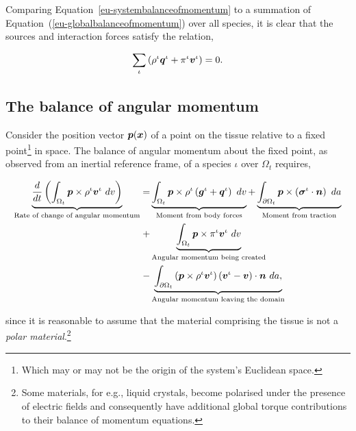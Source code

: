 \noindent Comparing Equation~\ref{eu-systembalanceofmomentum} to a
summation of Equation~(\ref{eu-globalbalanceofmomentum}) over all
species, it is clear that the sources and interaction forces satisfy
the relation,

\begin{equation}
\sum\limits_{\iota}\left( \rho^{\iota}\mbox{\boldmath$ q$}^{\iota} + \pi^{\iota}
\mbox{\boldmath$ v$}^{\iota} \right) = 0.
\label{eu-summationrelationmomentum}
\end{equation}

\subsection{The balance of angular momentum}
\label{eu-balance-of-angular-momentum}

Consider the position vector $\mbox{\boldmath$ p$}(\mbox{\boldmath$ x$})$ of a point on the tissue
relative to a fixed point\footnote{Which may or may not be
  the origin of the system's Euclidean space.} in space. The balance of angular
momentum about the fixed point, as observed from an inertial reference
frame, of a species $\iota$ over $\Omega_{t}$ requires,

\begin{equation}
\begin{split}
\underbrace{\frac{d}{dt}\left(\int_{\Omega_{t}}  \mbox{\boldmath$ p$} \times \rho^{\iota}
  \mbox{\boldmath$ v$}^{\iota}\ dv\right)}_{\text{Rate of change of angular  momentum}}  = 
& \underbrace{\int_{\Omega_{t}} \mbox{\boldmath$ p$} \times \rho^{\iota} \left(\mbox{\boldmath$ g$}^{\iota} +
  \mbox{\boldmath$ q$}^{\iota}\right)\ dv}_{\text{Moment from body forces}} 
+ \underbrace{\int_{\partial \Omega_{t}}
  \mbox{\boldmath$ p$} \times \left(\mbox{\boldmath$\sigma$}^{\iota}\cdot\mbox{\boldmath$ n$}\right)\ da}_{\text{Moment from traction}}\\ 
+ & \underbrace{\int_{\Omega_{t}} \mbox{\boldmath$ p$} \times
  \pi^{\iota}\mbox{\boldmath$ v$}^{\iota}\ dv}_{\text{Angular momentum being created}}
\\ 
- & \underbrace{\int_{\partial \Omega_{t}} \left(\mbox{\boldmath$ p$} \times \rho^{\iota}
  \mbox{\boldmath$ v$}^{\iota}\right) \left(\mbox{\boldmath$ v$}^{\iota} -
\mbox{\boldmath$ v$}\right) \cdot \mbox{\boldmath$ n$}\ da,}_{\text{Angular momentum leaving the domain}} 
\end{split}
\label{eu-globalbalanceofangularmomentum}
\end{equation}

\noindent since it is reasonable to assume that the material
comprising the tissue is not a {\em polar material}.\footnote{Some
  materials, for e.g., liquid crystals, become polarised under the
  presence of electric fields and consequently have additional global
  torque contributions to their balance of momentum equations.}


